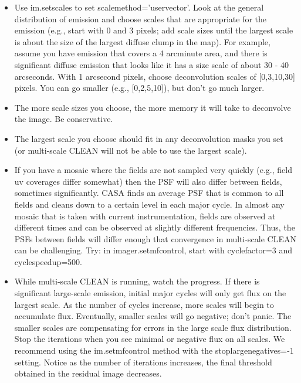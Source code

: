 \vspace{3mm}

\begin{itemize}

   \item Use im.setscales to set scalemethod='uservector'. Look at the
         general distribution of emission and choose scales that are
         appropriate for the emission (e.g., start with 0 and 3
         pixels; add scale sizes until the largest scale is about the
         size of the largest diffuse clump in the map). For example,
         assume you have emission that covers a 4 arcminute area, and
         there is significant diffuse emission that looks like it has
         a size scale of about 30 - 40 arcseconds. With 1 arcsecond
         pixels, choose deconvolution scales of [0,3,10,30]
         pixels. You can go smaller (e.g., [0,2,5,10]), but don't go
         much larger.

   \item The more scale sizes you choose, the more memory it will take
         to deconvolve the image. Be conservative.

   \item The largest scale you choose should fit in any deconvolution
         masks you set (or multi-scale CLEAN will not be able to use
         the largest scale).

   \item If you have a mosaic where the fields are not sampled very
          quickly (e.g., field uv coverages differ somewhat) then the
          PSF will also differ between fields, sometimes
          significantly. CASA finds an average PSF that is common to
          all fields and cleans down to a certain level in each major
          cycle.  In almost any mosaic that is taken with current
          instrumentation, fields are observed at different times and
          can be observed at slightly different frequencies. Thus, the
          PSFs between fields will differ enough that convergence in
          multi-scale CLEAN can be challenging. Try: in
          imager.setmfcontrol, start with cyclefactor=3 and
          cyclespeedup=500.

   \item While multi-scale CLEAN is running, watch the progress. If
         there is significant large-scale emission, initial major
         cycles will only get flux on the largest scale. As the number
         of cycles increase, more scales will begin to accumulate
         flux. Eventually, smaller scales will go negative; don't
         panic. The smaller scales are compensating for errors in the
         large scale flux distribution. Stop the iterations when you
         see minimal or negative flux on all scales. We recommend
         using the im.setmfcontrol method with the
         stoplargenegatives=-1 setting.  Notice as the number of
         iterations increases, the final threshold obtained in the
         residual image decreases.
\end{itemize}

